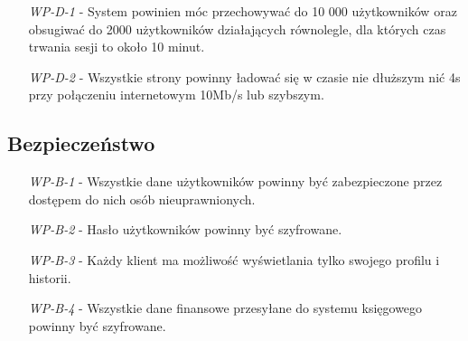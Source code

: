 \documentclass[a4paper,20pt]{article}
\begin{document}
\begin{itemize}
\item [\textit{WP-D-1}] - System powinien móc przechowywać do 10 000 użytkowników oraz obsugiwać do 2000 użytkowników działających równolegle, dla których czas trwania sesji to około 10 minut. \\

\item [\textit{WP-D-2}] - Wszystkie strony powinny ładować się w czasie nie dłuższym nić 4s przy połączeniu internetowym 10Mb/s lub szybszym.

\end{itemize}
 
\subsection{Bezpieczeństwo}

\begin{itemize}
\item [\textit{WP-B-1}] - Wszystkie dane użytkowników powinny być zabezpieczone przez dostępem do nich osób nieuprawnionych. \\

\item [\textit{WP-B-2}] - Hasło użytkowników powinny być szyfrowane. \\

\item [\textit{WP-B-3}] - Każdy klient ma możliwość wyświetlania tylko swojego profilu i historii. \\

\item [\textit{WP-B-4}] - Wszystkie dane finansowe przesyłane do systemu księgowego powinny być szyfrowane.

\end{itemize}
\end{document}

